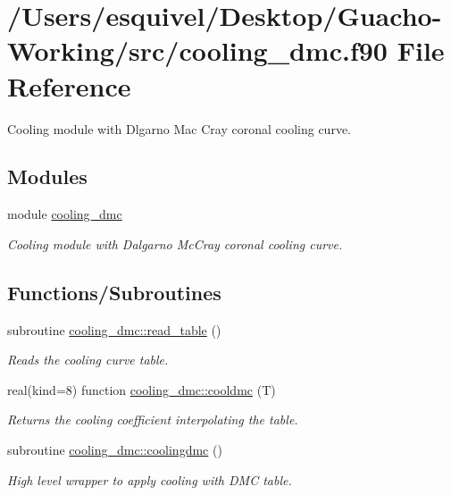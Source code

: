 \hypertarget{cooling__dmc_8f90}{}\section{/\+Users/esquivel/\+Desktop/\+Guacho-\/\+Working/src/cooling\+\_\+dmc.f90 File Reference}
\label{cooling__dmc_8f90}


Cooling module with Dlgarno Mac Cray coronal cooling curve.  


\subsection*{Modules}
\begin{DoxyCompactItemize}
\item 
module \hyperlink{namespacecooling__dmc}{cooling\+\_\+dmc}
\begin{DoxyCompactList}\small\item\em Cooling module with Dalgarno Mc\+Cray coronal cooling curve. \end{DoxyCompactList}\end{DoxyCompactItemize}
\subsection*{Functions/\+Subroutines}
\begin{DoxyCompactItemize}
\item 
subroutine \hyperlink{namespacecooling__dmc_a7874b4f8a76399e87e0a22aecd088cf8}{cooling\+\_\+dmc\+::read\+\_\+table} ()
\begin{DoxyCompactList}\small\item\em Reads the cooling curve table. \end{DoxyCompactList}\item 
real(kind=8) function \hyperlink{namespacecooling__dmc_af987bbf144f596d57b154427bbb82ae5}{cooling\+\_\+dmc\+::cooldmc} (T)
\begin{DoxyCompactList}\small\item\em Returns the cooling coefficient interpolating the table. \end{DoxyCompactList}\item 
subroutine \hyperlink{namespacecooling__dmc_a7af28062f0cd20c4bb0d86c895f4a8d6}{cooling\+\_\+dmc\+::coolingdmc} ()
\begin{DoxyCompactList}\small\item\em High level wrapper to apply cooling with D\+M\+C table. \end{DoxyCompactList}\end{DoxyCompactItemize}
